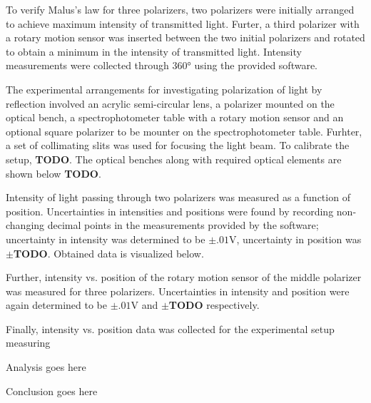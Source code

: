\begin{paper}
	To verify Malus's law for three polarizers, two polarizers were initially arranged to achieve maximum intensity of transmitted light. Furter, a third polarizer with a rotary motion sensor was inserted between the two initial polarizers and rotated to obtain a minimum in the intensity of transmitted light. Intensity measurements were collected through \( 360 \si{\degree} \) using the provided software.
	
	The experimental arrangements for investigating polarization of light by reflection involved an acrylic semi-circular lens, a polarizer mounted on the optical bench, a spectrophotometer table with a rotary motion sensor and an optional square polarizer to be mounter on the spectrophotometer table. Furhter, a set of collimating slits was used for focusing the light beam. To calibrate the setup, \textbf{TODO}. The optical benches along with required optical elements are shown below \textbf{TODO}.
	
	
	Intensity of light passing through two polarizers was measured as a function of position. Uncertainties in intensities and positions were found by recording non-changing decimal points in the measurements provided by the software; uncertainty in intensity was determined to be \( \pm .01 \si{\volt} \), uncertainty in position was \( \pm \)\textbf{TODO}. Obtained data is visualized below.
		
	Further, intensity vs. position of the rotary motion sensor of the middle polarizer was measured for three polarizers. Uncertainties in intensity and position were again determined to be \( \pm .01 \si{\volt} \) and \( \pm \)\textbf{TODO} respectively.
	
	Finally, intensity vs. position data was collected for the experimental setup measuring 
	
	
	Analysis goes here
	

	Conclusion goes here



\end{paper}

